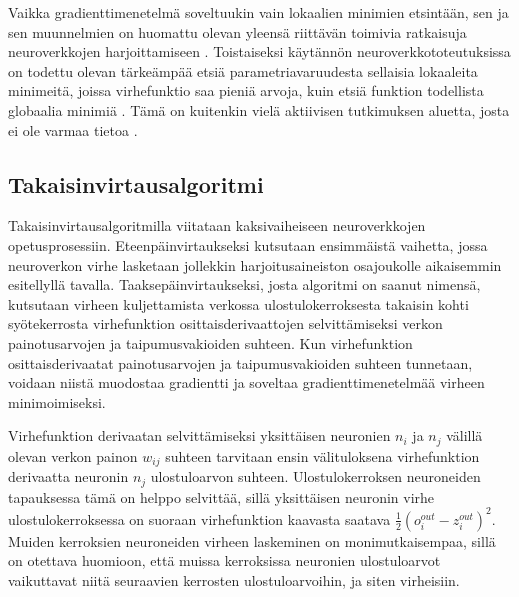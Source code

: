 \documentclass[finnish]{tktltiki2}
\theoremstyle{definition}
\theoremstyle{remark}
\begin{document}
    Vaikka gradienttimenetelmä soveltuukin vain lokaalien minimien etsintään, sen ja sen muunnelmien on huomattu olevan yleensä riittävän toimivia ratkaisuja neuroverkkojen harjoittamiseen \cite{Rumelhart-1986-back-prop}\cite{Goodfellow-et-al-2016}. Toistaiseksi käytännön neuroverkkototeutuksissa on todettu olevan tärkeämpää etsiä parametriavaruudesta sellaisia lokaaleita minimeitä, joissa virhefunktio saa pieniä arvoja, kuin etsiä funktion todellista globaalia minimiä \cite{neural-optimization-goodfellow-2015}. Tämä on kuitenkin vielä aktiivisen tutkimuksen aluetta, josta ei ole varmaa tietoa \cite{Goodfellow-et-al-2016}.



  \subsection{Takaisinvirtausalgoritmi}
    Takaisinvirtausalgoritmilla viitataan kaksivaiheiseen neuroverkkojen opetusprosessiin. Eteenpäinvirtaukseksi kutsutaan ensimmäistä vaihetta, jossa neuroverkon virhe lasketaan jollekkin harjoitusaineiston osajoukolle aikaisemmin esitellyllä tavalla. Taaksepäinvirtaukseksi, josta algoritmi on saanut nimensä, kutsutaan virheen kuljettamista verkossa ulostulokerroksesta takaisin kohti syötekerrosta virhefunktion osittaisderivaattojen selvittämiseksi verkon painotusarvojen ja taipumusvakioiden suhteen. Kun virhefunktion osittaisderivaatat painotusarvojen ja taipumusvakioiden suhteen tunnetaan, voidaan niistä muodostaa gradientti ja soveltaa gradienttimenetelmää virheen minimoimiseksi.

    Virhefunktion derivaatan selvittämiseksi yksittäisen neuronien $n_i$ ja $n_j$ välillä olevan verkon painon $w_{ij}$ suhteen tarvitaan ensin välituloksena virhefunktion derivaatta neuronin $n_j$ ulostuloarvon suhteen. Ulostulokerroksen neuroneiden tapauksessa tämä on helppo selvittää, sillä yksittäisen neuronin virhe ulostulokerroksessa on suoraan virhefunktion kaavasta saatava $\frac{1}{2} (o_{i}^{out} - z_i^{out})^2$. Muiden kerroksien neuroneiden virheen laskeminen on monimutkaisempaa, sillä on otettava huomioon, että muissa kerroksissa neuronien ulostuloarvot vaikuttavat niitä seuraavien kerrosten ulostuloarvoihin, ja siten virheisiin. 
\end{document}
